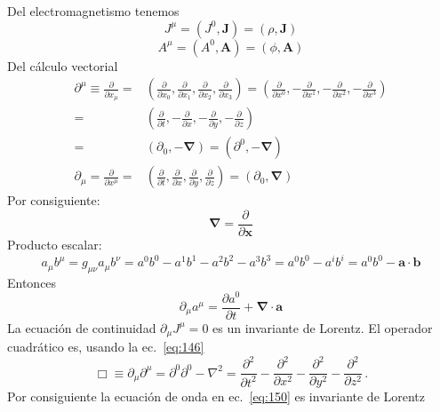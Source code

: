 Del electromagnetismo tenemos
\begin{equation}
  \label{eq:cv_jmu}
  J^\mu=(J^0,\mathbf{J})=(\rho,\mathbf{J})
\end{equation}
\begin{equation}
  \label{eq:cv_phia}
  A^\mu=(A^0,\mathbf{A})=(\phi,\mathbf{A})
\end{equation}
Del c\'alculo vectorial
\begin{align}
  \partial^\mu\equiv\frac{\partial}{\partial x_\mu}=&
  \left(
    \frac{\partial}{\partial x_0},\frac{\partial}{\partial x_1},\frac{\partial}{\partial x_2},\frac{\partial}{\partial x_3}
  \right)=\left(
    \frac{\partial}{\partial x^0},-\frac{\partial}{\partial x^1},-\frac{\partial}{\partial x^2},-\frac{\partial}{\partial x^3}
  \right)\nonumber\\
  =&\left(
    \frac{\partial}{\partial t},-\frac{\partial}{\partial x},-\frac{\partial}{\partial y},-\frac{\partial}{\partial z}
  \right)\nonumber\\
  =&(\partial_0,-\boldsymbol{\nabla})=(\partial^0,-\boldsymbol{\nabla})\\
  \partial_\mu=\frac{\partial}{\partial x^\mu}=&\left(
    \frac{\partial}{\partial t},\frac{\partial}{\partial x},\frac{\partial}{\partial y},\frac{\partial}{\partial z}
  \right)
  =(\partial_0,\boldsymbol{\nabla})
\end{align}
Por consiguiente:
\begin{equation}
  \label{eq:nabla}
  \boldsymbol{\nabla}=\frac{\partial}{\partial\mathbf{x}}
\end{equation}
Producto escalar:
\begin{equation}
  a_\mu b^\mu=g_{\mu\nu}a_\mu b^\nu=a^0b^0-a^1b^1-a^2b^2-a^3b^3=a^0b^0-a^i b^i=a^0b^0-\mathbf{a}\cdot \mathbf{b}
\end{equation}
Entonces
\begin{equation}
  \partial_\mu a^\mu=\frac{\partial a^0}{\partial t}+\boldsymbol{\nabla}\cdot\mathbf{a}
\end{equation}
La ecuaci\'on de continuidad $\partial_\mu J^\mu=0$ es un invariante de Lorentz.
El operador cuadr\'atico es, usando la ec.~\eqref{eq:146}
\begin{equation}
  \label{eq:dalambertian}
  \Box\equiv \partial_\mu\partial^\mu=\partial^0\partial^0-\nabla^2 =\frac{\partial^2}{\partial t^2}-\frac{\partial^2}{\partial x^2}-\frac{\partial^2}{\partial y^2}-\frac{\partial^2}{\partial z^2}\,.
\end{equation}
Por consiguiente la ecuaci\'on de onda en ec.~\eqref{eq:150} es invariante de Lorentz

